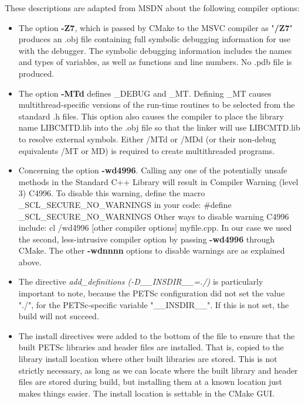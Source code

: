 \documentclass[10pt,a4paper]{article}
\begin{document}
These descriptions are adapted from MSDN about the following compiler options:
\begin{itemize}
\item The option \textbf{-Z7}, which is passed by CMake to the MSVC compiler as
"\textbf{/Z7}" produces an .obj file containing full symbolic debugging
information for use with the debugger. The symbolic debugging information
includes the names and types of variables, as well as functions and line
numbers. No .pdb file is produced.

\item The option \textbf{-MTd} defines \_DEBUG and \_MT. Defining \_MT causes
multithread-specific versions of the run-time routines to be selected from the
standard .h files. This option also causes the compiler to place the library
name LIBCMTD.lib into the .obj file so that the linker will use LIBCMTD.lib to
resolve external symbols. Either /MTd or /MDd (or their non-debug equivalents
/MT or MD) is required to create multithreaded programs. 

\item Concerning the option \textbf{-wd4996}.   Calling any one of the
potentially unsafe methods in the Standard C++ Library will result in Compiler
Warning (level 3) C4996. To disable this warning, define the macro
\_SCL\_SECURE\_NO\_WARNINGS in your code: \#define \_SCL\_SECURE\_NO\_WARNINGS
Other ways to disable warning C4996 include: cl /wd4996 [other compiler options]
myfile.cpp. In our case we used the second, less-intrusive compiler option by
passing \textbf{-wd4996} through CMake. The other \textbf{-wdnnnn} options to
disable warnings are as explained above.

\item The directive \textit{add\_definitions (-D\_\_INSDIR\_\_=./)} is
particularly important to note, because the PETSc configuration did not set the
value "./", for the PETSc-specific variable "\_\_INSDIR\_\_". If this is not
set, the build will not succeed.

\item The install directives were added to the bottom of the file to ensure that
the built PETSc libraries and header files are installed. That is, copied to the
library install location where other built libraries are stored. This is not
strictly necessary, as long as we can locate where the built library and header
files are stored during build, but installing them at a known location just
makes things easier. The install location is settable in the CMake GUI.
\end{itemize}
\end{document}
